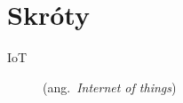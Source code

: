 \chapter*{Skróty}\mbox{}
\label{sec:skroty}
\noindent
\begin{description}
  \item [IoT] (ang.\ \emph{Internet of things}) %
\end{description}
